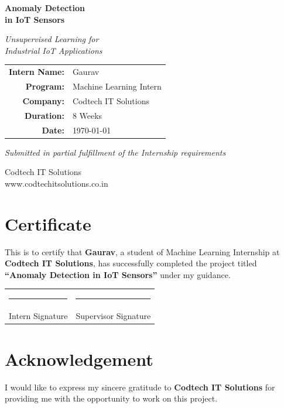 \documentclass[12pt,a4paper]{report}
\begin{document}
\begin{titlepage}
    \centering
    \vspace*{2cm}
    {\Huge\bfseries Anomaly Detection\\in IoT Sensors\par}
    \vspace{1.5cm}
    {\Large\textit{Unsupervised Learning for\\Industrial IoT Applications}\par}
    \vspace{2cm}
    {\Large
    \begin{tabular}{rl}
    \textbf{Intern Name:} & Gaurav \\
    \textbf{Program:} & Machine Learning Intern \\
    \textbf{Company:} & Codtech IT Solutions \\
    \textbf{Duration:} & 8 Weeks \\
    \textbf{Date:} & \today \\
    \end{tabular}\par}
    \vspace{2cm}
    {\large\textit{Submitted in partial fulfillment of the Internship requirements}\par}
    \vfill
    {\small Codtech IT Solutions\\www.codtechitsolutions.co.in\par}
\end{titlepage}

\chapter*{Certificate}
This is to certify that \textbf{Gaurav}, a student of Machine Learning Internship at \textbf{Codtech IT Solutions}, has successfully completed the project titled \textbf{``Anomaly Detection in IoT Sensors''} under my guidance.

\vspace{2cm}
\noindent\begin{tabular}{p{6cm}p{6cm}}
\rule{5cm}{0.4pt} & \rule{5cm}{0.4pt} \\
Intern Signature & Supervisor Signature \\
\end{tabular}

\chapter*{Acknowledgement}
I would like to express my sincere gratitude to \textbf{Codtech IT Solutions} for providing me with the opportunity to work on this project.
\end{document}
